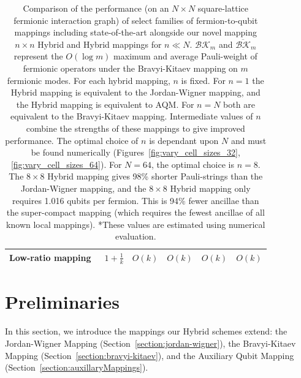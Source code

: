 \begin{table}
\begin{tabular}{k{6em} k{4.3em} k{4.5em} k{4.6em} k{5em} k{4.6em}}
        Low-ratio mapping~\cite{chen2022equivalence,steudtner2019quantum}&$1+\frac{1}{k}$&$O(k)$&$O(k)$&$O(k)$& $O(k)$\\ \hline
    \end{tabular}
    \caption{\label{tab:performance} { Comparison of the performance (on an $N \times N$ square-lattice fermionic interaction graph) of select families of fermion-to-qubit mappings including state-of-the-art alongside our novel mapping $n\times n$ Hybrid and Hybrid\+ mappings for $n \ll N$.  $\mathcal{BK}_m$ and $\overline{\mathcal{BK}}_m$ represent the $O(\log m)$ maximum and average Pauli-weight of fermionic operators under the Bravyi-Kitaev mapping on $m$ fermionic modes. For each hybrid mapping, $n$ is fixed. For $n=1$ the Hybrid mapping is equivalent to the Jordan-Wigner mapping, and the Hybrid\+ mapping is equivalent to AQM. For $n=N$ both are equivalent to the Bravyi-Kitaev mapping. Intermediate values of $n$ combine the strengths of these mappings to give improved performance. The optimal choice of $n$ is dependant upon $N$ and must be found numerically (Figures~\ref{fig:vary_cell_sizes_32},\ref{fig:vary_cell_sizes_64}). For $N=64$, the optimal choice is $n=8$. The $8 \times 8$ Hybrid mapping gives 98\% shorter Pauli-strings than the Jordan-Wigner mapping, and the $8 \times 8$ Hybrid\+ mapping only requires 1.016 qubits per fermion. This is 94\% fewer ancillae than the super-compact mapping (which requires the fewest ancillae of all known local mappings). *These values are estimated using numerical evaluation.} } 
\end{table}
\section{Preliminaries}
 In this section, we introduce the mappings our Hybrid schemes extend: the Jordan-Wigner Mapping (Section~\ref{section:jordan-wigner}), the Bravyi-Kitaev Mapping (Section~\ref{section:bravyi-kitaev}), and the Auxiliary Qubit Mapping (Section~\ref{section:auxillaryMappings}).

